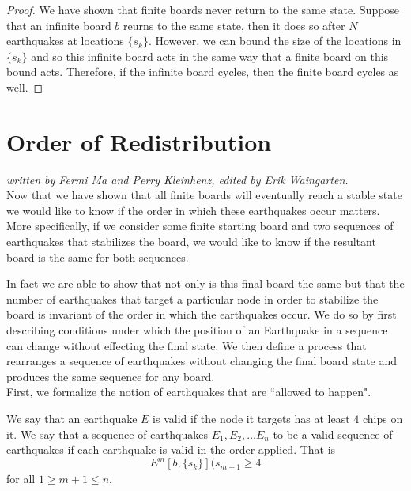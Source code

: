 \documentclass[runningheads,a4paper]{llncs}
\begin{document}
\begin{proof}
We have shown that finite boards never return to the same state. Suppose that an infinite board $b$ reurns to the same state, then it does so after $N$ earthquakes at locations $\{ s_k \}$. However, we can bound the size of the locations in $\{ s_k \}$ and so this infinite board acts in the same way that a finite board on this bound acts. Therefore, if the infinite board cycles, then the finite board cycles as well. 
\end{proof}

\section{Order of Redistribution}
\label{Order of Redistribution}

\emph{written by Fermi Ma and Perry Kleinhenz, edited by Erik Waingarten.}\\

Now that we have shown that all finite boards will eventually reach a stable state we would like to know if the order in which these earthquakes occur matters. More specifically, if we consider some finite starting board and two sequences of earthquakes that stabilizes the board, we would like to know if the resultant board is the same for both sequences. 

In fact we are able to show that not only is this final board the same but that the number of earthquakes that target a particular node in order to stabilize the board is invariant of the order in which the earthquakes occur. We do so by first describing conditions under which the position of an Earthquake in a sequence can change without effecting the final state. We then define a process that rearranges a sequence of earthquakes without changing the final board state and produces the same sequence for any board.\\

First, we formalize the notion of earthquakes that are ``allowed to happen".

\begin{definition}
We say that an earthquake $E$ is valid if the node it targets has at least $4$ chips on it. 
We say that a sequence of earthquakes $E_1, E_2, \ldots E_n$ to be a valid sequence of earthquakes if each earthquake is valid in the order applied. That is 
\begin{equation*}
E^{m}[b, \{s_k\}](s_{m+1}  \geq 4
\end{equation*}
for all $1\geq m+1 \leq n$.
\end{definition}
\end{document}
